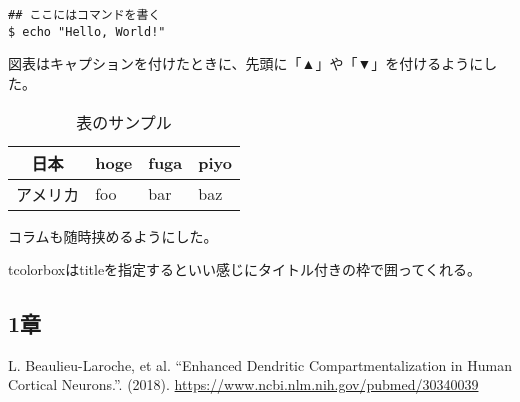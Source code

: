 \documentclass[11pt,dvipdfmx,b5paper,oneside]{jsbook}
\begin{document}
\begin{shaded}
\begin{verbatim}
## ここにはコマンドを書く
$ echo "Hello, World!"
\end{verbatim}
\end{shaded}

図表はキャプションを付けたときに、先頭に「▲」や「▼」を付けるようにした。

\begin{table}[H]
  \centering
  \caption{表のサンプル}
  \begin{tabular}{|c|l|l|l|} \hline
    日本 & hoge & fuga & piyo \\ \hline
    アメリカ & foo & bar & baz \\ \hline
  \end{tabular}
  \label{table-sample}
\end{table}

\begin{tcolorbox}[title=抑制性介在ニューロンによる]
  コラムも随時挟めるようにした。

  tcolorboxはtitleを指定するといい感じにタイトル付きの枠で囲ってくれる。
\end{tcolorbox}
\begin{thebibliography}{99}
\subsection*{1章}
 L. Beaulieu-Laroche, et al. ``Enhanced Dendritic Compartmentalization in Human Cortical Neurons.''. (2018). \url{https://www.ncbi.nlm.nih.gov/pubmed/30340039}
\end{thebibliography}
\end{document}
